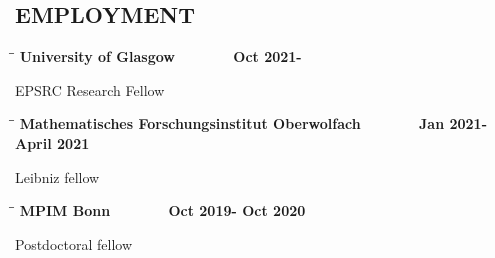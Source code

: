 \documentclass{res}
\begin{document}
 


\address{E-mail: ajmorgan44@gmail.com \\Date of birth: October 24, 1989\\ Webpage: amorgan516.github.io}
                                  
\begin{resume}       
 
 \section{EMPLOYMENT}       

\bigskip 

\vspace{-0.1in}	
   \begin{tabbing}
   \hspace{2in}\= \hspace{2in}\= \kill %
    {\bf University of Glasgow}\>~\> ~~~~~~ {\bf Oct 2021- }\\
   \end{tabbing}\vspace{-20pt}      %
     EPSRC Research Fellow

\vspace{-0.1in}	
   \begin{tabbing}
   \hspace{2in}\= \hspace{2in}\= \kill %
    {\bf Mathematisches Forschungsinstitut Oberwolfach}\>~\> ~~~~~~ {\bf Jan 2021- April 2021 }\\
   \end{tabbing}\vspace{-20pt}      %
     Leibniz  fellow  

\vspace{-0.1in}	
   \begin{tabbing}
   \hspace{2in}\= \hspace{2in}\= \kill %
    {\bf MPIM Bonn}\>~\> ~~~~~~ {\bf Oct 2019- Oct 2020}\\
   \end{tabbing}\vspace{-20pt}      %
      Postdoctoral fellow  


\end{resume}
\end{document}
